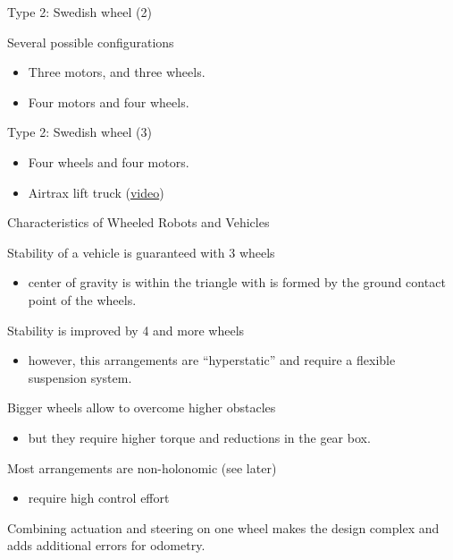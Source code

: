 \documentclass[compress]{beamer}
\begin{document}
\begin{frame}{Type 2: Swedish wheel (2)}

Several possible configurations

\begin{itemize}
    \item Three motors, and three wheels.
    \item Four motors and four wheels.
\end{itemize}

\end{frame}

\begin{frame}{Type 2: Swedish wheel (3)}

\begin{itemize}
    \item Four wheels and four motors.
    \item Airtrax lift truck
  (\href{http://www.youtube.com/watch?v=IlmKcohyXG0}{video})
\end{itemize}

\end{frame}

\begin{frame}{Characteristics of Wheeled Robots and Vehicles}

Stability of a vehicle is guaranteed with 3 wheels

\begin{itemize}
    \item center of gravity is within the triangle with is formed by the ground
  contact point of the wheels.
\end{itemize}

Stability is improved by 4 and more wheels

\begin{itemize}
    \item however, this arrangements are ``hyperstatic'' and require a flexible
  suspension system.
\end{itemize}

Bigger wheels allow to overcome higher obstacles

\begin{itemize}
    \item but they require higher torque and reductions in the gear box.
\end{itemize}

Most arrangements are non-holonomic (see later)

\begin{itemize}
    \item require high control effort
\end{itemize}

Combining actuation and steering on one wheel makes the design complex
and adds additional errors for odometry.

\end{frame}
\end{document}
